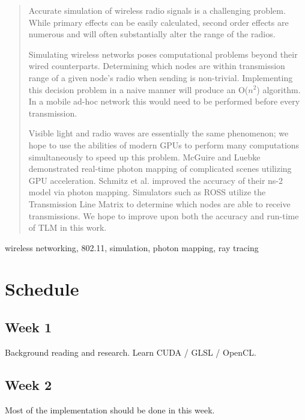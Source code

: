 \documentclass[%
        final,
        notitlepage,
        narroweqnarray,
        inline,
        twoside,
        ]{ieee}
\begin{document}
\begin{abstract}
Accurate simulation of wireless radio signals is a challenging problem.
While primary effects can be easily calculated, second order effects are
numerous and will often substantially alter the range of the radios.


Simulating wireless networks poses computational problems beyond their wired
counterparts.  Determining which nodes are within transmission range of a given
node's radio when sending is non-trivial.  Implementing this decision problem
in a naive manner will produce an O($n^2$) algorithm.  In a mobile ad-hoc
network this would need to be performed before every transmission.

Visible light and radio waves are essentially the same phenomenon;
we hope to use the abilities of modern GPUs to perform many computations
simultaneously to speed up this problem.  McGuire and Luebke
\cite{mcguire09imagespace} demonstrated real-time photon mapping
of complicated scenes utilizing GPU acceleration.  Schmitz et al.
\cite{Schmitz:2006:ERW:1164717.1164730}
\cite{Schmitz:2006:WPU:1163610.1163638}
improved the accuracy of their ns-2 model via photon mapping.  
Simulators such as ROSS \cite{ross} utilize the Transmission Line Matrix
\cite{Nutaro:2006:DEM:1138464.1138468} to determine which nodes are able
to receive transmissions.  We hope to improve upon both the accuracy and 
run-time of TLM in this work.

\end{abstract}
\vspace{5mm}
\begin{keywords}
wireless networking, 802.11, simulation, photon mapping, ray tracing
\end{keywords}

\section{Schedule}
\subsection*{Week 1}
Background reading and research.  Learn CUDA / GLSL / OpenCL.

\subsection*{Week 2}
Most of the implementation should be done in this week.
\end{document}
